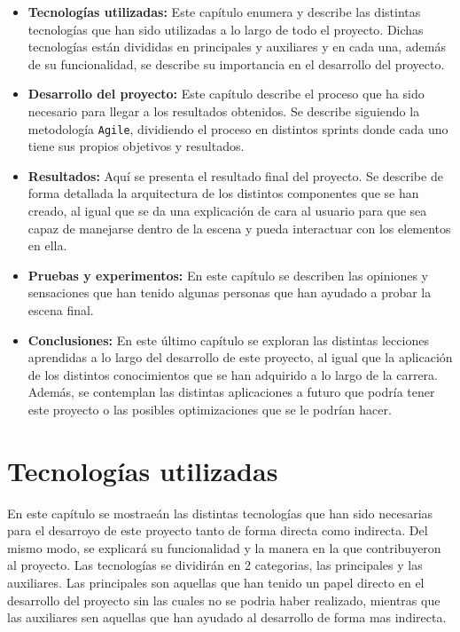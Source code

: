 \documentclass[a4paper, 12pt]{book}
\begin{document}
\begin{itemize}
  \item \textbf{Tecnologías utilizadas:} Este capítulo enumera y describe las distintas tecnologías que han sido utilizadas a lo largo de todo el proyecto. Dichas tecnologías están divididas en principales y auxiliares y en cada una, además de su funcionalidad, se describe su importancia en el desarrollo del proyecto.
  \item \textbf{Desarrollo del proyecto:} Este capítulo describe el proceso que ha sido necesario para llegar a los resultados obtenidos. Se describe siguiendo la metodología \texttt{Agile}, dividiendo el proceso en distintos sprints donde cada uno tiene sus propios objetivos y resultados.
  \item \textbf{Resultados:} Aquí se presenta el resultado final del proyecto. Se describe de forma detallada la arquitectura de los distintos componentes que se han creado, al igual que se da una explicación de cara al usuario para que sea capaz de manejarse dentro de la escena y pueda interactuar con los elementos en ella. 
  \item \textbf{Pruebas y experimentos:} En este capítulo se describen las opiniones y sensaciones que han tenido algunas personas que han ayudado a probar la escena final. 
  \item \textbf{Conclusiones:} En este último capítulo se exploran las distintas lecciones aprendidas a lo largo del desarrollo de este proyecto, al igual que la aplicación de los distintos conocimientos que se han adquirido a lo largo de la carrera. Además, se contemplan las distintas aplicaciones a futuro que podría tener este proyecto o las posibles optimizaciones que se le podrían hacer.
\end{itemize}



\cleardoublepage %
\chapter{Tecnologías utilizadas} 
\label{chap:tecnologias} %
En este capítulo se mostraeán las distintas tecnologías que han sido necesarias para el desarroyo de este proyecto tanto de forma directa como indirecta. Del mismo modo, se explicará su funcionalidad
y la manera en la que contribuyeron al proyecto. Las tecnologías se dividirán en 2 categorias, las principales y las auxiliares. Las principales son aquellas que han tenido un papel directo en el desarrollo 
del proyecto sin las cuales no se podria haber realizado, mientras que las auxiliares sen aquellas que han ayudado al desarrollo de forma mas indirecta.  
\end{document}
